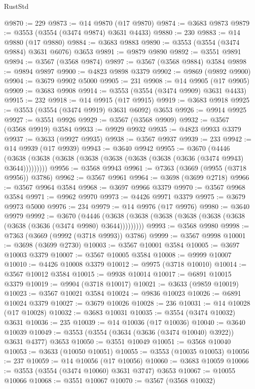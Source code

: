 \begin{lexlean}{RustStd}
\begin{coremodule}
@9870 := 229
@9873 := @14 @9870 (@17 @9870)
@9874 := @3683 @9873
@9879 := @3553 (@3554 (@3474 @9874) @3631 @4433)
@9880 := 230
@9883 := @14 @9880 (@17 @9880)
@9884 := @3683 @9883
@9890 := @3553 (@3554 (@3474 @9884) @3631 @6076) @3653
@9891 := @9879 @9890
@9892 := @3551 @9891
@9894 := @3567 (@3568 @9874)
@9897 := @3567 (@3568 @9884) @3584
@9898 := @9894 @9897
@9900 := @4823 @9898 @3379
@9902 := @9869 (@9892 @9900)
@9904 := @3679 @9902 @5000
@9905 := 231
@9908 := @14 @9905 (@17 @9905)
@9909 := @3683 @9908
@9914 := @3553 (@3554 (@3474 @9909) @3631 @4433)
@9915 := 232
@9918 := @14 @9915 (@17 @9915)
@9919 := @3683 @9918
@9925 := @3553 (@3554 (@3474 @9919) @3631 @6092) @3653
@9926 := @9914 @9925
@9927 := @3551 @9926
@9929 := @3567 (@3568 @9909)
@9932 := @3567 (@3568 @9919) @3584
@9933 := @9929 @9932
@9935 := @4823 @9933 @3379
@9937 := @3633 (@9927 @9935)
@9938 := @3567 @9937
@9939 := 233
@9942 := @14 @9939 (@17 @9939)
@9943 := @3640 @9942
@9955 := @3670
    (@4446 (@3638 (@3638 (@3638 (@3638 (@3638 (@3638 (@3638 (@3636 (@3474 @9943) @3644)))))))))
@9956 := @3568 @9943
@9961 := @7363 (@3669 (@9955 (@3718 @9956)) @3786)
@9962 := @3567 @9961
@9964 := @3698 (@3699 @2718)
@9966 := @3567 @9964 @3584
@9968 := @3697 @9966 @3379
@9970 := @3567 @9968 @3584
@9971 := @9962 @9970
@9973 := @4426 @9971 @3379
@9975 := @3679 @9973 @5000
@9976 := 234
@9979 := @14 @9976 (@17 @9976)
@9980 := @3640 @9979
@9992 := @3670
    (@4446 (@3638 (@3638 (@3638 (@3638 (@3638 (@3638 (@3638 (@3636 (@3474 @9980) @3644)))))))))
@9993 := @3568 @9980
@9998 := @7363 (@3669 (@9992 (@3718 @9993)) @3786)
@9999 := @3567 @9998
@10001 := @3698 (@3699 @2730)
@10003 := @3567 @10001 @3584
@10005 := @3697 @10003 @3379
@10007 := @3567 @10005 @3584
@10008 := @9999 @10007
@10010 := @4426 @10008 @3379
@10012 := @9975 (@3718 @10010)
@10014 := @3567 @10012 @3584
@10015 := @9938 @10014
@10017 := @6891 @10015 @3379
@10019 := @9904 (@3718 @10017)
@10021 := @3633 (@9859 @10019)
@10023 := @3567 @10021 @3584
@10024 := @9836 @10023
@10026 := @6891 @10024 @3379
@10027 := @3679 @10026
@10028 := 236
@10031 := @14 @10028 (@17 @10028)
@10032 := @3683 @10031
@10035 := @3554 (@3474 @10032) @3631
@10036 := 235
@10039 := @14 @10036 (@17 @10036)
@10040 := @3640 @10039
@10049 := @3553 (@3554 (@3634 (@3636 (@3474 @10040) @3922)) @3631 @4377) @3653
@10050 := @3551 @10049
@10051 := @3568 @10040
@10053 := @3633 (@10050 @10051)
@10055 := @3553 (@10035 @10053)
@10056 := 237
@10059 := @14 @10056 (@17 @10056)
@10060 := @3683 @10059
@10066 := @3553 (@3554 (@3474 @10060) @3631 @3747) @3653
@10067 := @10055 @10066
@10068 := @3551 @10067
@10070 := @3567 (@3568 @10032)

\end{coremodule}
\end{lexlean}
